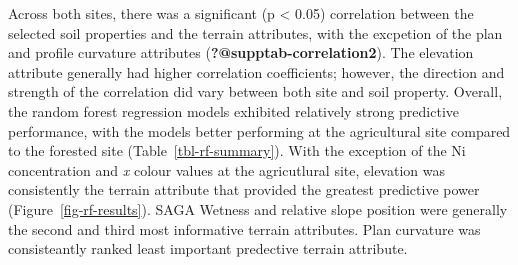 \documentclass[
  number]{elsarticle}
\begin{document}
Across both sites, there was a significant (p \textless{} 0.05)
correlation between the selected soil properties and the terrain
attributes, with the excpetion of the plan and profile curvature
attributes (\textbf{?@supptab-correlation2}). The elevation attribute
generally had higher correlation coefficients; however, the direction
and strength of the correlation did vary between both site and soil
property. Overall, the random forest regression models exhibited
relatively strong predictive performance, with the models better
performing at the agricultural site compared to the forested site
(Table~\ref{tbl-rf-summary}). With the exception of the Ni concentration
and \emph{x} colour values at the agricutlural site, elevation was
consistently the terrain attribute that provided the greatest predictive
power (Figure~\ref{fig-rf-results}). SAGA Wetness and relative slope
position were generally the second and third most informative terrain
attributes. Plan curvature was consisteantly ranked least important
predective terrain attribute.
\end{document}
